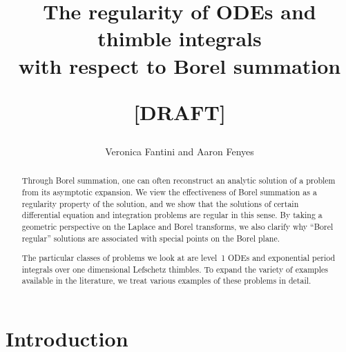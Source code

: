 \documentclass{article}
\title{The regularity of ODEs and thimble integrals \\
with respect to Borel summation \begin{draft}\textbf{[DRAFT]}\end{draft}}
\author{Veronica Fantini and Aaron Fenyes}
\theoremstyle{definition}
\theoremstyle{plain}
\begin{document}
\maketitle

\begin{abstract}
Through Borel summation, one can often reconstruct an analytic solution of a problem from its asymptotic expansion.
We view the effectiveness of Borel summation as a regularity property of the solution, and we show that the solutions of certain differential equation and integration problems are regular in this sense. By taking a geometric perspective on the Laplace and Borel transforms, we also clarify why ``Borel regular'' solutions are associated with special points on the Borel plane.

The particular classes of problems we look at are level~1 ODEs and exponential period integrals over one dimensional Lefschetz thimbles. To expand the variety of examples available in the literature, we treat various examples of these problems in detail.

\end{abstract}
\tableofcontents
%
%
%
\section{Introduction}
\end{document}
